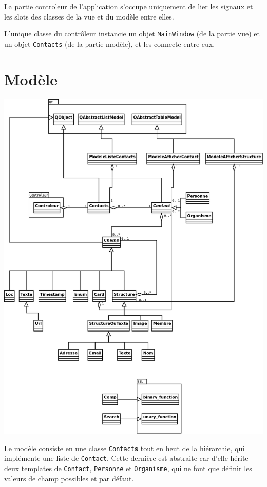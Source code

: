 \documentclass[a4paper,12pt]{report}
\begin{document}
La partie controleur de l'application s'occupe uniquement de lier les signaux et les slots des classes de la vue et du modèle entre elles.

L'unique classe du contrôleur instancie un objet \texttt{MainWindow} (de la partie vue) et un objet \texttt{Contacts} (de la partie modèle), et les connecte entre eux.

\section{Modèle}

\includegraphics[scale=0.3]{../dia/ClassDiagramModel.png}

Le modèle consiste en une classe \texttt{Contact\bf{s}} tout en heut de la hiérarchie, qui implémente une liste de \texttt{Contact}.
Cette dernière est abstraite car d'elle hérite deux templates de \texttt{Contact}, \texttt{Personne} et \texttt{Organisme}, qui ne font que définir les valeurs de champ possibles et par défaut.
\end{document}
